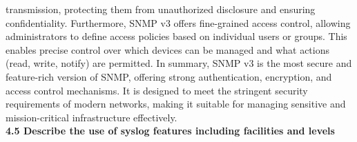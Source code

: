 \documentclass{article}
\begin{document}
transmission, protecting them from unauthorized disclosure and ensuring confidentiality. Furthermore, SNMP v3 offers fine-grained access control, allowing administrators to define access policies based on individual users or groups. This enables precise control over which devices can be managed and what actions (read, write, notify) are permitted. In summary, SNMP v3 is the most secure and feature-rich version of SNMP, offering strong authentication, encryption, and access control mechanisms. It is designed to meet the stringent security requirements of modern networks, making it suitable for managing sensitive and mission-critical infrastructure effectively.\\
  
\textbf{4.5 Describe the use of syslog features including facilities and levels}\\
\end{document}
